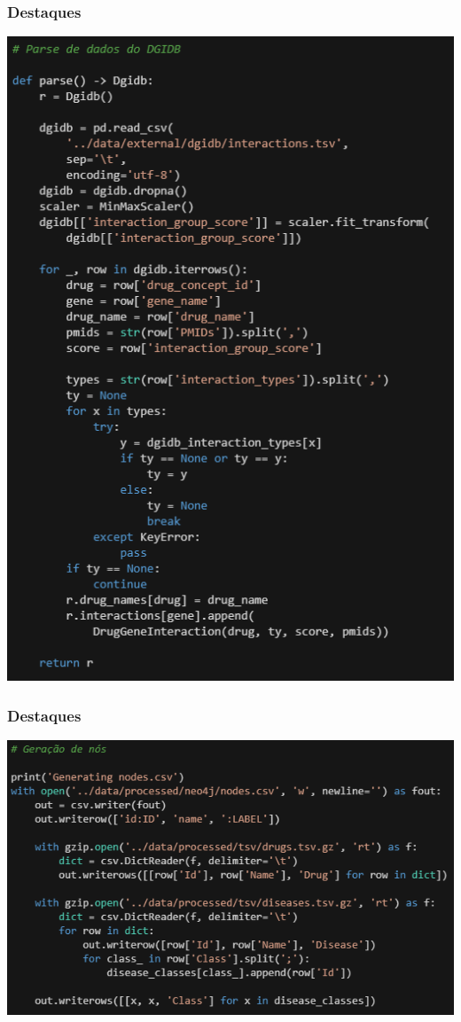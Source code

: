 \documentclass[12pt]{beamer}
\begin{document}
\begin{frame}
  \frametitle{Destaques}

  \centering
  \includegraphics[scale=0.35]{c2}
\end{frame}

\begin{frame}
  \frametitle{Destaques}

  \centering
  \includegraphics[scale=0.5]{c3}
\end{frame}
\end{document}
